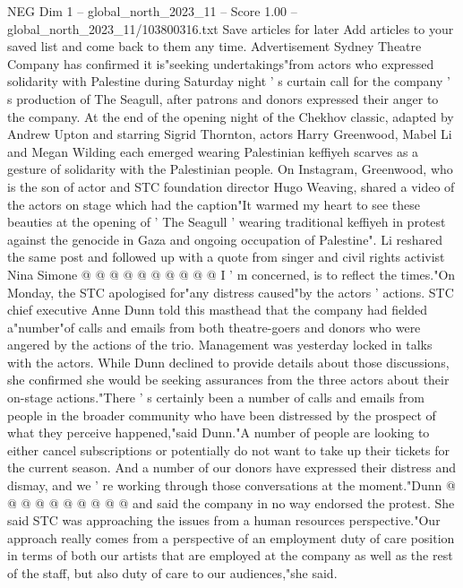 \begin{textsample}{NEG Dim 1 – global\_north\_2023\_11 – Score 1.00 – global\_north\_2023\_11/103800316.txt}  \label{ex:f1_neg_192}
Save articles for later Add articles to your saved list and come back to them any time.
Advertisement Sydney Theatre Company has confirmed it is"seeking undertakings"from actors who expressed solidarity with Palestine during Saturday night ' s curtain call for the company ' s production of The Seagull, after patrons and donors expressed their anger to the company.
At the end of the opening night of the Chekhov classic, adapted by Andrew Upton and starring Sigrid Thornton, actors Harry Greenwood, Mabel Li and Megan Wilding each emerged wearing Palestinian keffiyeh scarves as a gesture of solidarity with the Palestinian people.
On Instagram, Greenwood, who is the son of actor and STC foundation director Hugo Weaving, shared a video of the actors on stage which had the caption"It warmed my heart to see these beauties at the opening of ' The Seagull ' wearing traditional keffiyeh in protest against the genocide in Gaza and ongoing occupation of Palestine".
Li reshared the same post and followed up with a quote from singer and civil rights activist Nina Simone @ @ @ @ @ @ @ @ @ @ I ' m concerned, is to reflect the times."On Monday, the STC apologised for"any distress caused"by the actors ' actions.
STC chief executive Anne Dunn told this masthead that the company had fielded a"number"of calls and emails from both theatre-goers and donors who were angered by the actions of the trio.
Management was yesterday locked in talks with the actors.
While Dunn declined to provide details about those discussions, she confirmed she would be seeking assurances from the three actors about their on-stage actions."There ' s certainly been a number of calls and emails from people in the broader community who have been distressed by the prospect of what they perceive happened,"said Dunn."A number of people are looking to either cancel subscriptions or potentially do not want to take up their tickets for the current season.
And a number of our donors have expressed their distress and dismay, and we ' re working through those conversations at the moment."Dunn @ @ @ @ @ @ @ @ @ @ and said the company in no way endorsed the protest.
She said STC was approaching the issues from a human resources perspective."Our approach really comes from a perspective of an employment duty of care position in terms of both our artists that are employed at the company as well as the rest of the staff, but also duty of care to our audiences,"she said.

\end{textsample}
